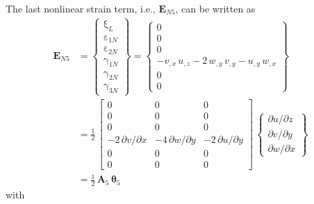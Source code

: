 The last nonlinear strain term, i.e., $\mathbf{E}_{N5}$, can be written as
\begin{equation}
	\begin{aligned}
		\mathbf{E}_{N5} & =  \begin{Bmatrix}
			\mathrm \xi_{L} \\
			\mathrm \varepsilon_{1N} \\                    
			\mathrm \varepsilon_{2N} \\           
			\mathrm \gamma_{1N} \\                
			\mathrm \gamma_{2N} \\                
			\mathrm \gamma_{3N} \end{Bmatrix} =   
		\begin{Bmatrix}                       
			0\\
			0   \\
			0  \\
			- v_{,x} \, u_{,z} - 2 \, w_{,y} \, v_{,y}  - u_{,y} \, w_{,x} \\
			0 \\ 
			0 \end{Bmatrix} \\
		& = \frac{1}{2} \, \begin{bmatrix}
			0 & 0 &  0   \\
			0 &  0 & 0  \\
			0 &  0 & 0 \\
			- 2 \, \partial v / \partial x & - 4 \, \partial w / \partial y & - 2 \, \partial u / \partial y  \\
			0 &  0 & 0  \\
			0 &  0 & 0  \end{bmatrix} \, \begin{Bmatrix}
			\partial u / \partial z\\
			\partial v / \partial y \\
			\partial w / \partial x
		\end{Bmatrix} \\
	    &	= \tfrac{1}{2} \, \mathbf{A}_5 \, \boldsymbol{\theta}_5
	\end{aligned}
\end{equation}
with  

